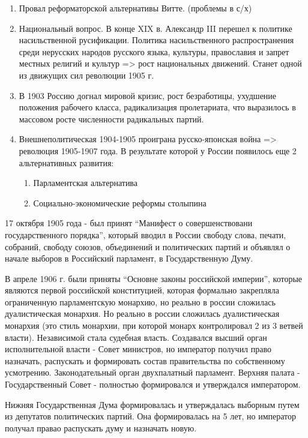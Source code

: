 \documentclass[a4paper]{article}
\begin{document}
\begin{enumerate}
    \item Провал реформаторской альтернативы Витте. (проблемы в с/х)
    \item Национальный вопрос. В конце XIX в. Александр III перешел к политике насильственной русификации. Политика насильственного распространения среди нерусских народов русского языка, культуры, православия и запрет местных религий и культур => рост национальных движений. Станет одной из движущих сил революции 1905 г.

    \item В 1903 Россию догнал мировой кризис, рост безработицы, ухудшение положения рабочего класса, радикализация пролетариата, что выразилось в массовом росте численности радикальных партий.

    \item Внешнеполитическая 1904-1905 проиграна русско-японская война => революция 1905-1907 года. В результате которой у России появилось еще 2 альтернативных развития:
        \begin{enumerate}
            \item Парламентская альтернатива
            \item Социально-экономические реформы столыпина
        \end{enumerate}
\end{enumerate}

17 октября 1905 года - был принят ``Манифест о совершенствовани государственного порядка'', который вводил в России свободу слова, печати, собраний, свободу союзов, объединений и политических партий и объявлял о начале выборов в Российский парламент, в Государственную Думу.

В апреле 1906 г. были приняты ``Основне законы российской империи'', которые являются первой российской конституцией, которая формально закрепляла ограниченную парламентскую монархию, но реально в россии сложилась дуалистическая монархия. Но реально в россии сложилась дуалистическая монархия (это стиль монархии, при которой монарх контролировал 2 из 3 ветвей власти). Независимой стала судебная власть. Создавался высший орган исполнительной власти - Совет министров, но император получил право назначать, распускать и формировать состав правительства по собственному усмотрению. Законодательный орган двухпалатный парламент. Верхняя палата - Государственный Совет - полностью формировался и утверждался императором.

Нижняя Государственная Дума формировалась и утверждалась выборным путем из депутатов политических партий. Она формировалась на 5 лет, но император получал правао распускать думу и назначать новую.
\end{document}
